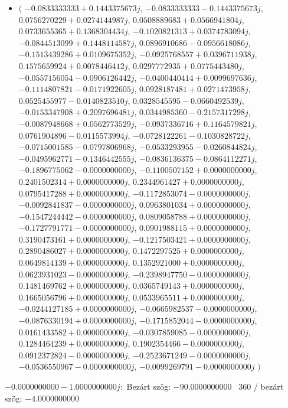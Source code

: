\documentclass[14pt,a4paper]{article}
\begin{document}
\begin{itemize}
\item
$\big($
$-0.0833333333+0.1443375673j$, $-0.0833333333-0.1443375673j$, $0.0756270229+0.0274144987j$, $0.0508889683+0.0566941804j$, $0.0733655365+0.1368304434j$, $-0.1020821313+0.0374783094j$, $-0.0844513099+0.1448114587j$, $0.0896910686-0.0956618086j$, $-0.1513439286+0.0109675352j$, $-0.0925768557+0.0396711938j$, $0.1575659924+0.0078446412j$, $0.0297772935+0.0775443480j$, $-0.0557156054-0.0906126442j$, $-0.0400440414+0.0099697636j$, $-0.1114807821-0.0171922605j$, $0.0928187481+0.0271473958j$, $0.0525455977-0.0140823510j$, $0.0328545595-0.0660492539j$, $-0.0153347908+0.2097696481j$, $0.0344985360-0.2157317298j$, $-0.0087948668+0.0562773529j$, $-0.0937336716+0.1164579821j$, $0.0761904896-0.0115573994j$, $-0.0728122261-0.1030828722j$, $-0.0715001585-0.0797806968j$, $-0.0533293955-0.0260844824j$, $-0.0495962771-0.1346442555j$, $-0.0836136375-0.0864112271j$, $-0.1896775062-0.0000000000j$, $-0.1100507152+0.0000000000j$, $0.2401502314+0.0000000000j$, $0.2344961427+0.0000000000j$, $0.0795417288+0.0000000000j$, $-0.1172853074-0.0000000000j$, $-0.0092841837-0.0000000000j$, $0.0963801034+0.0000000000j$, $-0.1547244442-0.0000000000j$, $0.0809058788+0.0000000000j$, $-0.1727791771-0.0000000000j$, $0.0901988115+0.0000000000j$, $0.3190473161+0.0000000000j$, $-0.1217503421+0.0000000000j$, $0.2890486027+0.0000000000j$, $0.1472297525+0.0000000000j$, $0.0649814139+0.0000000000j$, $0.1352921000+0.0000000000j$, $0.0623931023-0.0000000000j$, $-0.2398947750-0.0000000000j$, $0.1481469762+0.0000000000j$, $0.0365749143+0.0000000000j$, $0.1665056796+0.0000000000j$, $0.0533965511+0.0000000000j$, $-0.0244127185+0.0000000000j$, $-0.0665982537-0.0000000000j$, $-0.0876330194+0.0000000000j$, $-0.1715852044-0.0000000000j$, $0.0161433582+0.0000000000j$, $-0.0307859085-0.0000000000j$, $0.1284464239+0.0000000000j$, $0.1902354466-0.0000000000j$, $0.0912372824-0.0000000000j$, $-0.2523671249-0.0000000000j$, $-0.0536550967-0.0000000000j$, $-0.0099269791-0.0000000000j$
$\big)$
\end{itemize}
$-0.0000000000-1.0000000000j$:\
Bezárt szög: $-90.0000000000$ \
360 / bezárt szög: $-4.0000000000$\
\end{document}
